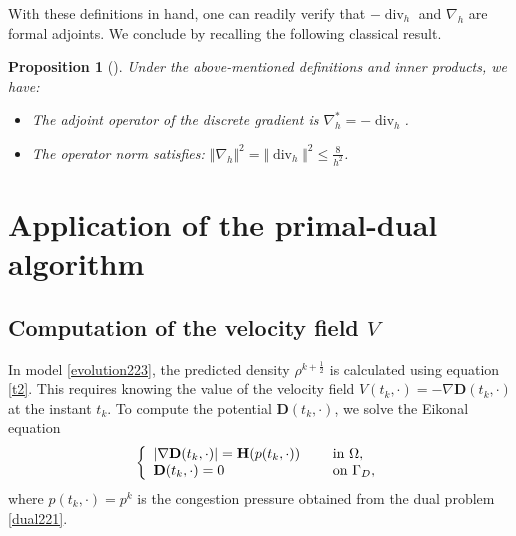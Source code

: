 \documentclass[final,reqno]{amsart}
\theoremstyle{plain}
\newtheorem{proposition}{Proposition}	%
\theoremstyle{definition}
\theoremstyle{remark}
\numberwithin{remark}{section}	%
\numberwithin{example}{section}	%
\DeclareMathOperator{\dive}{div}
\newcommand{\de}{\mathbf{D}}
\newcommand{\he}{\mathbf{H}}
\begin{document}
With these definitions in hand, one can readily verify that $-\dive_h$ and $\nabla_h$ are formal adjoints. We conclude by recalling the following classical result.

\begin{proposition}[\cite{chambolle2011first}]\label{prop:adj_norm}
    Under the above-mentioned definitions and inner products, we have:
    \begin{itemize}
        \item The adjoint operator of the discrete gradient is $\nabla^{*}_h = -\operatorname{div}_h$.
        \item The operator norm satisfies: $\Vert \nabla_h \Vert^2 = \Vert \operatorname{div}_h\Vert^2 \leq \frac{8}{h^2}$.
    \end{itemize}
\end{proposition}


\section{Application of the primal-dual algorithm}\label{appendix:pd}

\subsection{Computation of the velocity field $V$}

In model \eqref{evolution223}, the predicted density $\rho^{k+\frac{1}{2}}$ is calculated using equation \eqref{t2}. This requires knowing the value of the velocity field $V(t_k,\cdot)=-\nabla \de(t_k,\cdot)$ at the instant $t_k$. To compute the potential $\de(t_k,\cdot)$, we solve the Eikonal equation
\begin{equation}\label{eikp}
	\left\{ \begin{array}{ll}
		\vert \nabla \de(t_k,\cdot)\vert =\he(p(t_k,\cdot))\quad & \hbox{ in }\Omega,\\  
		\de(t_k,\cdot) =0 & \hbox{ on }\Gamma_D,
	\end{array}
	\right.
\end{equation}
where $p(t_k,\cdot)=p^k$ is the congestion pressure obtained from the dual problem \eqref{dual221}. 
\end{document}

